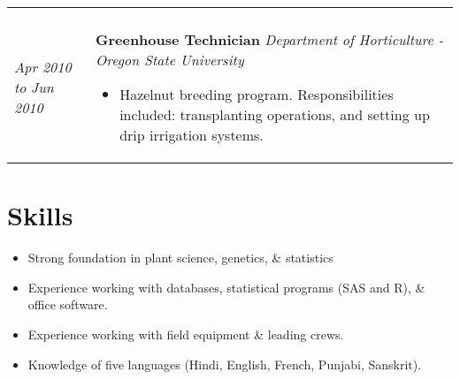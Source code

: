 \documentclass[a4paper]{article}
\begin{document}
\begin{tabular}{p{3cm} p{14cm}}
\begin{itemize}[noitemsep,topsep=0pt]
\end{itemize}
%
\\
%
\vspace{0pt} 
\textit{Apr 2010}\newline
\textit{to}\newline
\textit{Jun 2010}\newline
&
\vspace{0pt}
\textbf{Greenhouse Technician}\newline
\textit{Department of Horticulture - Oregon State University}
\begin{itemize}[noitemsep,topsep=0pt]
  \item Hazelnut breeding program. Responsibilities included: transplanting operations, and setting up drip irrigation systems.
\end{itemize}
\end{tabular}


\section*{Skills}
\begin{itemize}[noitemsep,topsep=0pt]
\item{Strong foundation in plant science, genetics, \& statistics}
\item{Experience working with databases, statistical programs (SAS and R), \& office software.}
\item{Experience working with field equipment \& leading crews.}
\item{Knowledge of five languages (Hindi, English, French, Punjabi, Sanskrit).}
\end{itemize}
\end{document}
